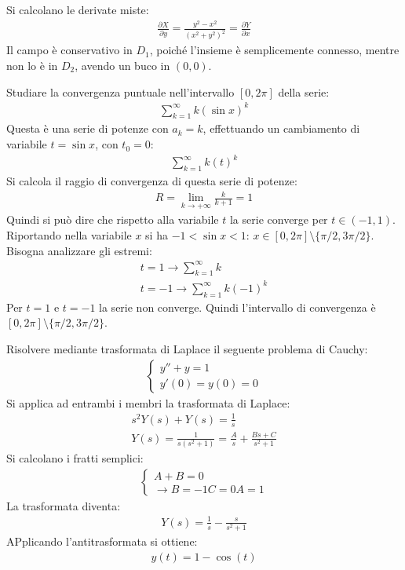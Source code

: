 \documentclass{article}
\numberwithin{equation}{subsection}
\begin{document}
Si calcolano le derivate miste:
\begin{gather*}
    \frac{\partial X}{\partial y}=\frac{y^2-x^2}{(x^2+y^2)^2}=\frac{\partial Y}{\partial x}
\end{gather*}
Il campo è conservativo in $D_1$, poiché l'insieme è semplicemente connesso, mentre non lo è in $D_2$, avendo un buco in $(0,0)$. 


Studiare la convergenza puntuale nell'intervallo $[0,2\pi]$ della serie:
\begin{gather*}
    \sum_{k=1}^\infty k(\sin x)^k
\end{gather*}
Questa è una serie di potenze con $a_k=k$, effettuando un cambiamento di variabile $t=\sin x$, con $t_0=0$:
\begin{gather*}
    \sum_{k=1}^\infty k(t)^k
\end{gather*}
Si calcola il raggio di convergenza di questa serie di potenze:
\begin{gather*}
    R=\lim_{k\to+\infty}\frac{k}{k+1}=1
\end{gather*}
Quindi si può dire che rispetto alla variabile $t$ la serie converge per $t\in(-1,1)$. 
Riportando nella variabile $x$ si ha $-1<\sin x<1$: $x\in[0,2\pi]\setminus\{\pi/2,3\pi/2\}$. Bisogna analizzare gli estremi:
\begin{gather*}
    t=1\to\sum_{k=1}^\infty k\\
    t=-1\to\sum_{k=1}^\infty k(-1)^k
\end{gather*}
Per $t=1$ e $t=-1$ la serie non converge. Quindi l'intervallo di convergenza è $[0,2\pi]\setminus\{\pi/2,3\pi/2\}$. 


Risolvere mediante trasformata di Laplace il seguente problema di Cauchy:
\begin{gather*}
    \begin{cases}
        y''+y=1\\
        y'(0)=y(0)=0
    \end{cases}
\end{gather*}
Si applica ad entrambi i membri la trasformata di Laplace:
\begin{gather*}
    s^2Y(s)+Y(s)=\frac{1}{s}\\
    Y(s)=\frac{1}{s(s^2+1)}=\frac{A}{s}+\frac{Bs+C}{s^2+1}
\end{gather*}
Si calcolano i fratti semplici:
\begin{gather*}
    \begin{cases}
        A+B=0\\\to B=-1
        C=0
        A=1
    \end{cases}
\end{gather*}
La trasformata diventa:
\begin{gather*}
    Y(s)=\frac{1}{s}-\frac{s}{s^2+1}
\end{gather*}
APplicando l'antitrasformata si ottiene:
\begin{gather*}
    y(t)=1-\cos(t)
\end{gather*}
\end{document}

